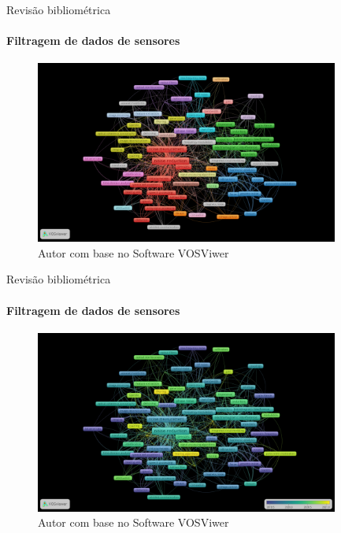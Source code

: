 \documentclass[]{beamer}
\begin{document}
\begin{frame}{Revisão bibliométrica}
	\framesubtitle{Filtragem de dados de sensores}
	
	\begin{figure}[!htb]	
		\begin{center}
			\includegraphics[width=10cm,height=6cm]{../anexos/ris/IEEE/Noise_reduction_and_noise_abatement_andsensor_filtering_algorithm/network_visualization_with_lines.png}
		\end{center}
		\caption{Autor com base no Software VOSViwer}
		\label{figura:network_visualization_with_lines}
	\end{figure}	

\end{frame}

\begin{frame}{Revisão bibliométrica}
	\framesubtitle{Filtragem de dados de sensores}
	
	\begin{figure}[!htb]	
		\begin{center}
			\includegraphics[width=10cm,height=6cm]{../anexos/ris/IEEE/Noise_reduction_and_noise_abatement_andsensor_filtering_algorithm/overlay_visualization.png}
		\end{center}
		\caption{Autor com base no Software VOSViwer}
		\label{figura:network_visualization_with_lines}
	\end{figure}	

\end{frame}
\end{document}
